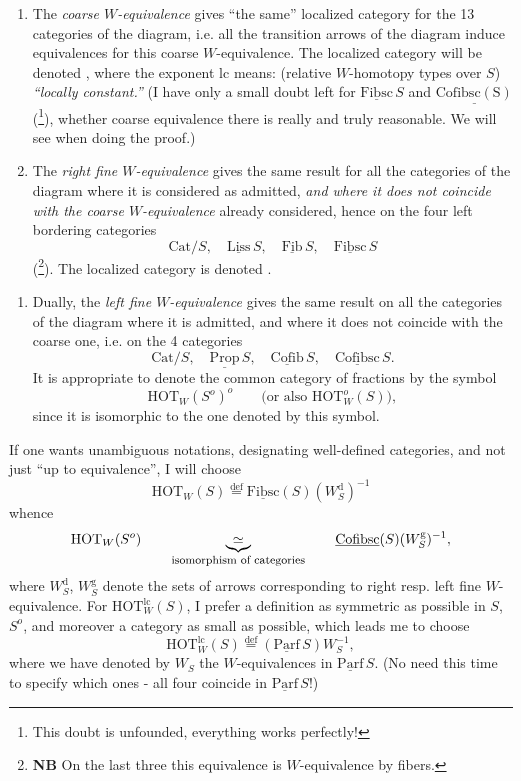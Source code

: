 \documentclass[11pt]{article}
\newcommand{\printedpage}[1]{\marginpar{\footnotesize p.~#1}}
\newcommand{\msp}[1]{\marginpar{\footnotesize [#1]}}
\newcommand{\uc}[1]{\underline{\mathrm{#1}}}
\newcommand{\HOT}{\mathrm{HOT}}
\newcommand{\Cat}{\mathrm{Cat}}
\newcommand{\defeq}{\overset{\text{def}}{=}}
\begin{document}
\begin{enumerate}[leftmargin=*]
\item[$1^o$)] The \textit{coarse $W$-equivalence} gives ``the same'' localized category for the 13 categories of the diagram, i.e. all the transition arrows of the diagram induce equivalences for this coarse $W$-equivalence. The localized category will be denoted \fbox{$\HOT^{\mathrm{lc}}_W(S)$}, where the exponent lc means: (relative $W$-homotopy types over $S$) \textit{``locally constant.''} (I have only a small doubt left for $\uc{Fibsc}\,S$ and $\uc{Cofibsc(S)}$ (\footnote[34]{This doubt is unfounded, everything works perfectly!}), whether coarse equivalence there is really and truly reasonable. We will see when doing the proof.)

\item[$2^o$)] The \textit{right fine $W$-equivalence} gives the same result for all the categories of the diagram where it is considered as admitted, \textit{and where it does not coincide with the coarse $W$-equivalence} already considered, hence on the four left bordering categories
\[
\Cat/S,\quad \uc{Liss}\,S,\quad \uc{Fib}\,S,\quad \uc{Fibsc}\,S
\]
(\footnote[35]{\textbf{NB} On the last three this equivalence is $W$-equivalence by fibers.}). The localized category is denoted \fbox{$\HOT_W(S)$}.
\end{enumerate}

\msp{page 50}

\printedpage{31}

\begin{enumerate}[leftmargin=*]
\item[$2'^o$)] Dually, the \textit{left fine $W$-equivalence} gives the same result on all the categories of the diagram where it is admitted, and where it does not coincide with the coarse one, i.e. on the 4 categories
\[
\Cat/S,\quad \uc{Prop}\,S,\quad \uc{Cofib}\,S,\quad \uc{Cofibsc}\,S.
\]
It is appropriate to denote the common category of fractions by the symbol
\[
\HOT_W(S^o)^o \qquad \text{(or also $\HOT^o_W(S)$)},
\]
since it is isomorphic to the one denoted by this symbol.
\end{enumerate}

If one wants unambiguous notations, designating well-defined categories, and not just ``up to equivalence'', I will choose
\[
\HOT_W(S) \defeq \uc{Fibsc}(S)(W^{\mathrm{d}}_S)^{-1}
\]
whence
\[
\HOT_W(S^o) \qquad \underbrace{\simeq}_{\text{\footnotesize isomorphism of categories}} \qquad \uc{Cofibsc}(S)(W^{\mathrm{g}}_S)^{-1},
\]
where $W^{\mathrm{d}}_S$, $W^{\mathrm{g}}_S$ denote the sets of arrows corresponding to right resp. left fine $W$-equivalence. For $\HOT^{\mathrm{lc}}_W(S)$, I prefer a definition as symmetric as possible in $S$, $S^o$, and moreover a category as small as possible, which leads me to choose
\[
\HOT^{\mathrm{lc}}_W(S) \defeq (\uc{Parf}\,S)W^{-1}_S,
\]
where we have denoted by $W_S$ the $W$-equivalences in $\uc{Parf}\,S$. (No need this time to specify which ones - all four coincide in $\uc{Parf}\,S$!)
\end{document}
